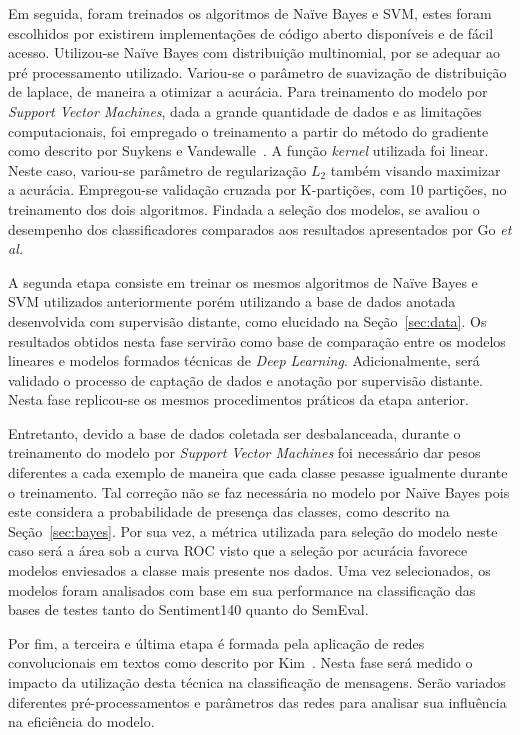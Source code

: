 Em seguida, foram treinados os algoritmos de Naïve Bayes e SVM, estes foram escolhidos por existirem implementações de
código aberto disponíveis e de fácil acesso.
Utilizou-se Naïve Bayes com distribuição multinomial, por se adequar ao pré processamento utilizado.
Variou-se o parâmetro de suavização de distribuição de laplace, de maneira a otimizar a acurácia.
Para treinamento do modelo por \textit{Support Vector Machines}, dada a grande quantidade de dados e as limitações
computacionais, foi empregado o treinamento a partir do método do gradiente como descrito por Suykens e
Vandewalle~\cite{suykens99}.
A função \textit{kernel} utilizada foi linear.
Neste caso, variou-se parâmetro de regularização $L_{2}$ também visando maximizar a acurácia.
Empregou-se validação cruzada por K-partições, com 10 partições, no treinamento dos dois algoritmos.
Findada a seleção dos modelos, se avaliou o desempenho dos classificadores comparados aos resultados apresentados por Go
\textit{et al.}

A segunda etapa consiste em treinar os mesmos algoritmos de Naïve Bayes e SVM utilizados anteriormente porém utilizando
a base de dados anotada desenvolvida com supervisão distante, como elucidado na Seção~\ref{sec:data}.
Os resultados obtidos nesta fase servirão como base de comparação entre os modelos lineares e modelos formados técnicas
de \textit{Deep Learning}.
Adicionalmente, será validado o processo de captação de dados e anotação por supervisão distante.
Nesta fase replicou-se os mesmos procedimentos práticos da etapa anterior.

Entretanto, devido a base de dados coletada ser desbalanceada, durante o treinamento do modelo por
\textit{Support Vector Machines} foi necessário dar pesos diferentes a cada exemplo de maneira que cada classe pesasse
igualmente durante o treinamento.
Tal correção não se faz necessária no modelo por Naïve Bayes pois este considera a probabilidade de presença das classes,
como descrito na Seção~\ref{sec:bayes}.
Por sua vez, a métrica utilizada para seleção do modelo neste caso será a área sob a curva ROC visto que a seleção por
acurácia favorece modelos enviesados a classe mais presente nos dados.
Uma vez selecionados, os modelos foram analisados com base em sua performance na classificação das bases de testes tanto
do Sentiment140 quanto do SemEval.

Por fim, a terceira e última etapa é formada pela aplicação de redes convolucionais em textos como descrito por
Kim~\cite{kim14}.
Nesta fase será medido o impacto da utilização desta técnica na classificação de mensagens.
Serão variados diferentes pré-processamentos e parâmetros das redes para analisar sua influência na eficiência do
modelo.

